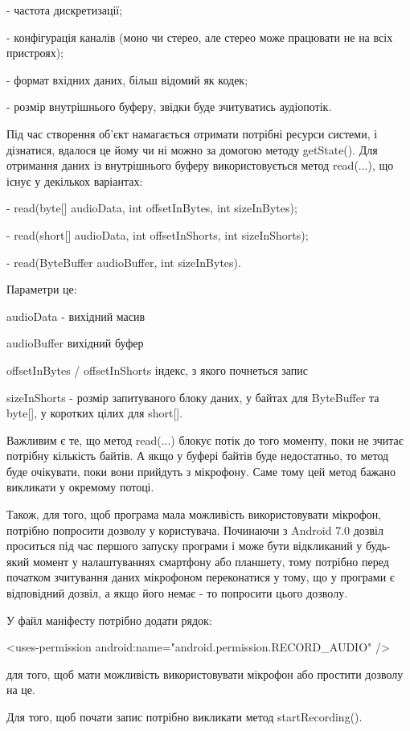 - частота дискретизації;

- конфігурація каналів (моно чи стерео, але стерео може працювати не на всіх 
пристроях);

- формат вхідних даних, більш відомий як кодек;

- розмір внутрішнього буферу, звідки буде зчитуватись аудіопотік.

Під час створення об'єкт намагається отримати потрібні ресурси системи, і дізнатися, вдалося це йому чи ні можно за домогою методу getState(). Для отримання даних із внутрішнього буферу використовується метод read(...), що існує у декількох варіантах:

- read(byte[] audioData, int offsetInBytes, int sizeInBytes);

- read(short[] audioData, int offsetInShorts, int sizeInShorts);

- read(ByteBuffer audioBuffer, int sizeInBytes).

Параметри це:

audioData - вихідний масив

audioBuffer	вихідний буфер

offsetInBytes / offsetInShorts	індекс, з якого почнеться запис

sizeInShorts - розмір запитуваного блоку даних, у байтах для ByteBuffer та byte[], у коротких цілих для short[].

Важливим є те, що метод read(...) блокує потік до того моменту, поки не зчитає потрібну кількість байтів. А якщо у буфері байтів буде недостатньо, то метод буде очікувати, поки вони прийдуть з мікрофону. Саме тому цей метод бажано викликати у окремому потоці.

Також, для того, щоб програма мала можливість використовувати мікрофон, потрібно попросити дозволу у користувача. Починаючи з Android 7.0 дозвіл проситься під час першого запуску програми і може бути відкликаний у будь-який момент у налаштуваннях смартфону або планшету, тому потрібно перед початком зчитування даних мікрофоном переконатися у тому, що у програми є відповідний дозвіл, а якщо його немає - то попросити цього дозволу.

У файл маніфесту потрібно додати рядок:

<uses-permission android:name="android.permission.RECORD\_AUDIO" />

для того, щоб мати можливість використовувати мікрофон або простити дозволу на це.

Для того, щоб почати запис потрібно викликати метод startRecording().


